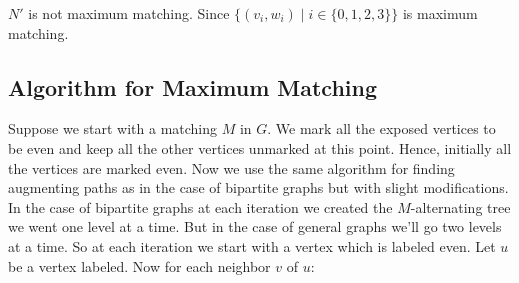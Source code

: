 $N'$ is not maximum matching. Since $\{(v_i,w_i)\mid i\in\{0,1,2,3\}\}$ is maximum matching.

\subsection{Algorithm for Maximum Matching}
Suppose we start with a matching $M$ in $G$. We mark all the exposed vertices to be even and keep all the other vertices unmarked at this point. Hence, initially all the vertices are marked even. Now we use the same algorithm for finding augmenting paths as in the case of bipartite graphs but with slight modifications. In the case of bipartite graphs at each iteration we created the $M$-alternating tree we went one level at a time. But in the case of general graphs we'll go two levels at a time. So at each iteration we start with a vertex which is labeled even. Let $u$ be a vertex labeled. Now for each neighbor $v$ of $u$:
